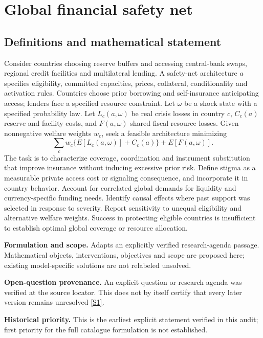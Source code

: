 \documentclass[11pt]{article}
\newcommand{\sref}[2]{\hyperlink{source:#1:#2}{[S#2]}}
\begin{document}
\section*{Global financial safety net}\label{30007621}
\subsection{Definitions and mathematical statement}
Consider countries choosing reserve buffers and accessing central-bank swaps, regional credit facilities and multilateral lending. A safety-net architecture \(a\) specifies eligibility, committed capacities, prices, collateral, conditionality and activation rules. Countries choose prior borrowing and self-insurance anticipating access; lenders face a specified resource constraint. Let \(\omega\) be a shock state with a specified probability law. Let \(L_c(a,\omega)\) be real crisis losses in country \(c\), \(C_c(a)\) reserve and facility costs, and \(F(a,\omega)\) shared fiscal resource losses. Given nonnegative welfare weights \(w_c\), seek a feasible architecture minimizing
\[\sum_cw_c\{E[L_c(a,\omega)]+C_c(a)\}+E[F(a,\omega)].\]
The task is to characterize coverage, coordination and instrument substitution that improve insurance without inducing excessive prior risk. Define stigma as a measurable private access cost or signaling consequence, and incorporate it in country behavior. Account for correlated global demands for liquidity and currency-specific funding needs. Identify causal effects where past support was selected in response to severity. Report sensitivity to unequal eligibility and alternative welfare weights. Success in protecting eligible countries is insufficient to establish optimal global coverage or resource allocation.

\par\textbf{Formulation and scope.} Adapts an explicitly verified research-agenda passage. Mathematical objects, interventions, objectives and scope are proposed here; existing model-specific solutions are not relabeled unsolved.

\par\textbf{Open-question provenance.} An explicit question or research agenda was verified at the source locator. This does not by itself certify that every later version remains unresolved \sref{30007621}{1}.

\par\textbf{Historical priority.} This is the earliest explicit statement verified in this audit; first priority for the full catalogue formulation is not established.
\end{document}
